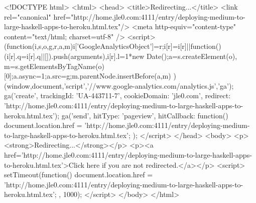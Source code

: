 <!DOCTYPE html>
<html>
<head>
<title>Redirecting...</title>
<link rel="canonical" href="http://home.jle0.com:4111/entry/deploying-medium-to-large-haskell-apps-to-heroku.html.tex"/>
<meta http-equiv="content-type" content="text/html; charset=utf-8" />
<script>
(function(i,s,o,g,r,a,m){i['GoogleAnalyticsObject']=r;i[r]=i[r]||function(){
(i[r].q=i[r].q||[]).push(arguments)},i[r].l=1*new Date();a=s.createElement(o),
m=s.getElementsByTagName(o)[0];a.async=1;a.src=g;m.parentNode.insertBefore(a,m)
})(window,document,'script','//www.google-analytics.com/analytics.js','ga');
ga('create', { trackingId: 'UA-443711-7', cookieDomain: 'jle0.com', redirect: 'http://home.jle0.com:4111/entry/deploying-medium-to-large-haskell-apps-to-heroku.html.tex'});
ga('send', { hitType: 'pageview', hitCallback: function() { document.location.href = 'http://home.jle0.com:4111/entry/deploying-medium-to-large-haskell-apps-to-heroku.html.tex'; } });
</script>
</head>
<body>
  <p><strong>Redirecting...</strong></p>
  <p><a href='http://home.jle0.com:4111/entry/deploying-medium-to-large-haskell-apps-to-heroku.html.tex'>Click here if you are not redirected.</a></p>
  <script>
    setTimeout(function() { document.location.href = 'http://home.jle0.com:4111/entry/deploying-medium-to-large-haskell-apps-to-heroku.html.tex'; }, 1000);
  </script>
</body>
</html>
